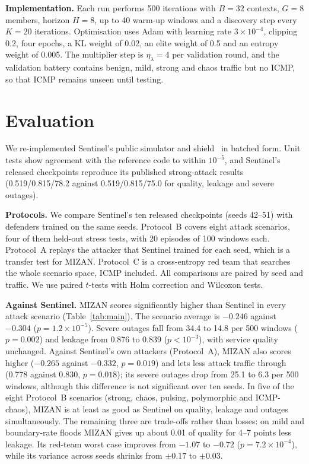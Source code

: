 \documentclass[journal]{IEEEtran}
\begin{document}
\textbf{Implementation.} Each run performs 500 iterations with $B=32$ contexts, $G=8$ members, horizon $H=8$, up to 40 warm-up windows and a discovery step every $K=20$ iterations. Optimisation uses Adam with learning rate $3\times10^{-4}$, clipping 0.2, four epochs, a KL weight of 0.02, an elite weight of 0.5 and an entropy weight of 0.005. The multiplier step is $\eta_\lambda=4$ per validation round, and the validation battery contains benign, mild, strong and chaos traffic but no ICMP, so that ICMP remains unseen until testing.

\section{Evaluation}
\label{sec:eval}
We re-implemented Sentinel's public simulator and shield~\cite{sentinelcode} in batched form. Unit tests show agreement with the reference code to within $10^{-5}$, and Sentinel's released checkpoints reproduce its published strong-attack results (0.519/0.815/78.2 against 0.519/0.815/75.0 for quality, leakage and severe outages).

\textbf{Protocols.} We compare Sentinel's ten released checkpoints (seeds 42--51) with defenders trained on the same seeds. Protocol~B covers eight attack scenarios, four of them held-out stress tests, with 20 episodes of 100 windows each. Protocol~A replays the attacker that Sentinel trained for each seed, which is a transfer test for MIZAN. Protocol~C is a cross-entropy red team that searches the whole scenario space, ICMP included. All comparisons are paired by seed and traffic. We use paired $t$-tests with Holm correction and Wilcoxon tests.



\textbf{Against Sentinel.} MIZAN scores significantly higher than Sentinel in every attack scenario (Table~\ref{tab:main}). The scenario average is $-0.246$ against $-0.304$ ($p=1.2\times10^{-5}$). Severe outages fall from 34.4 to 14.8 per 500 windows ($p=0.002$) and leakage from 0.876 to 0.839 ($p<10^{-3}$), with service quality unchanged. Against Sentinel's own attackers (Protocol~A), MIZAN also scores higher ($-0.265$ against $-0.332$, $p=0.019$) and lets less attack traffic through (0.778 against 0.830, $p=0.018$); its severe outages drop from 25.1 to 6.3 per 500 windows, although this difference is not significant over ten seeds. In five of the eight Protocol~B scenarios (strong, chaos, pulsing, polymorphic and ICMP-chaos), MIZAN is at least as good as Sentinel on quality, leakage and outages simultaneously. The remaining three are trade-offs rather than losses: on mild and boundary-rate floods MIZAN gives up about 0.01 of quality for 4--7 points less leakage. Its red-team worst case improves from $-1.07$ to $-0.72$ ($p=7.2\times10^{-4}$), while its variance across seeds shrinks from $\pm0.17$ to $\pm0.03$.
\end{document}
